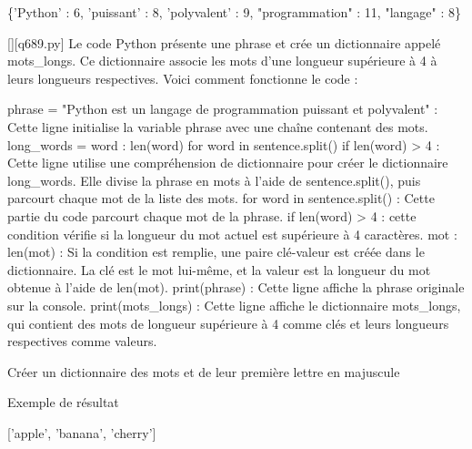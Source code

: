 \{'Python' : 6, 'puissant' : 8, 'polyvalent' : 9, "programmation" : 11, "langage" : 8\}
        \par
        \begin{solution}
            \renewcommand{\nomfichier}{q689.py}
            \pythonfile{\chemincode \nomfichier}[][\nomfichier]
            Le code Python présente une phrase et crée un dictionnaire appelé mots_longs. Ce dictionnaire associe les mots d'une longueur supérieure à 4 à leurs longueurs respectives. Voici comment fonctionne le code :

    phrase = "Python est un langage de programmation puissant et polyvalent" : Cette ligne initialise la variable phrase avec une chaîne contenant des mots.
    long_words = {word : len(word) for word in sentence.split() if len(word) > 4} : Cette ligne utilise une compréhension de dictionnaire pour créer le dictionnaire long_words. Elle divise la phrase en mots à l'aide de sentence.split(), puis parcourt chaque mot de la liste des mots.
        for word in sentence.split() : Cette partie du code parcourt chaque mot de la phrase.
        if len(word) > 4 : cette condition vérifie si la longueur du mot actuel est supérieure à 4 caractères.
        {mot : len(mot)} : Si la condition est remplie, une paire clé-valeur est créée dans le dictionnaire. La clé est le mot lui-même, et la valeur est la longueur du mot obtenue à l'aide de len(mot).
    print(phrase) : Cette ligne affiche la phrase originale sur la console.
    print(mots_longs) : Cette ligne affiche le dictionnaire mots_longs, qui contient des mots de longueur supérieure à 4 comme clés et leurs longueurs respectives comme valeurs.
        \end{solution}
        

        \question
        Créer un dictionnaire des mots et de leur première lettre en majuscule

Exemple de résultat

['apple', 'banana', 'cherry']

